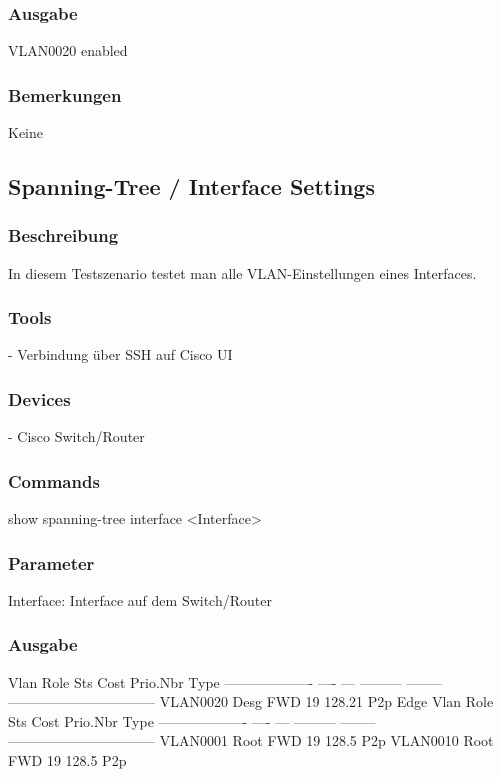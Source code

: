 \documentclass[a4,12pt]{scrartcl}
\begin{document}
\subsubsection{Ausgabe}
VLAN0020            enabled
\subsubsection{Bemerkungen}
Keine


\subsection{Spanning-Tree / Interface Settings}
\subsubsection{Beschreibung}
In diesem Testszenario testet man alle VLAN-Einstellungen eines Interfaces.
\subsubsection{Tools}
- Verbindung über SSH auf Cisco UI
\subsubsection{Devices}
- Cisco Switch/Router
\subsubsection{Commands}
show spanning-tree interface <Interface>
\subsubsection{Parameter}
Interface: Interface auf dem Switch/Router
\subsubsection{Ausgabe}
Vlan                Role Sts Cost      Prio.Nbr Type\newline
------------------- ---- --- --------- -------- --------------------------------\newline
VLAN0020            Desg FWD 19        128.21   P2p Edge\newline
Vlan                Role Sts Cost      Prio.Nbr Type\newline
------------------- ---- --- --------- -------- --------------------------------\newline
VLAN0001            Root FWD 19        128.5    P2p\newline
VLAN0010            Root FWD 19        128.5    P2p\newline
\end{document}
